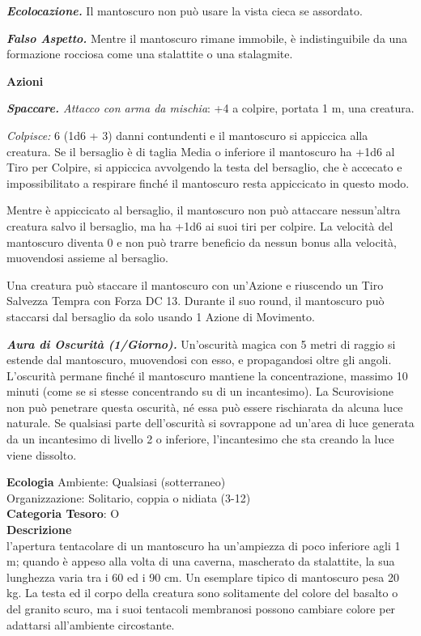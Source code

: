 \begin{multicols}{2}
{\emph{\textbf{Ecolocazione.}} Il mantoscuro non può usare la vista cieca se assordato.

\emph{\textbf{Falso Aspetto.}} Mentre il mantoscuro rimane immobile, è indistinguibile da una formazione rocciosa come una stalattite o una stalagmite.

\textbf{Azioni}

\emph{\textbf{Spaccare.} Attacco con arma da mischia}: +4 a colpire, portata 1 m, una creatura.

\emph{Colpisce:} 6 (1d6 + 3) danni contundenti e il mantoscuro si appiccica alla creatura. Se il bersaglio è di taglia Media o inferiore il mantoscuro ha +1d6 al Tiro per Colpire, si appiccica avvolgendo la testa del bersaglio, che è accecato e impossibilitato a respirare finché il mantoscuro resta appiccicato in questo modo.

Mentre è appiccicato al bersaglio, il mantoscuro non può attaccare nessun'altra creatura salvo il bersaglio, ma ha +1d6 ai suoi tiri per colpire. La velocità del mantoscuro diventa 0 e non può trarre beneficio da nessun bonus alla velocità, muovendosi assieme al bersaglio.

Una creatura può staccare il mantoscuro con un'Azione e riuscendo un Tiro Salvezza Tempra con Forza DC 13. Durante il suo round, il mantoscuro può staccarsi dal bersaglio da solo usando 1 Azione di Movimento.

\emph{\textbf{Aura di Oscurità (1/Giorno).}} Un'oscurità magica con 5 metri di raggio si estende dal mantoscuro, muovendosi con esso, e propagandosi oltre gli angoli. L'oscurità permane finché il mantoscuro mantiene la concentrazione, massimo 10 minuti (come se si stesse concentrando su di un incantesimo). La Scurovisione non può penetrare questa oscurità, né essa può essere rischiarata da alcuna luce naturale. Se qualsiasi parte dell'oscurità si sovrappone ad un'area di luce generata da un incantesimo di livello 2 o inferiore, l'incantesimo che sta creando la luce viene dissolto.

\textbf{Ecologia}
Ambiente: Qualsiasi (sotterraneo)\\
Organizzazione: Solitario, coppia o nidiata (3-12)\\
\textbf{Categoria Tesoro}: O\\
\textbf{Descrizione}\\
l'apertura tentacolare di un mantoscuro ha un'ampiezza di poco inferiore agli 1 m; quando è appeso alla volta di una caverna, mascherato da stalattite, la sua lunghezza varia tra i 60 ed i 90 cm. Un esemplare tipico di mantoscuro pesa 20 kg. La testa ed il corpo della creatura sono solitamente del colore del basalto o del granito scuro, ma i suoi tentacoli membranosi possono cambiare colore per adattarsi all'ambiente circostante.

}
\end{multicols}

